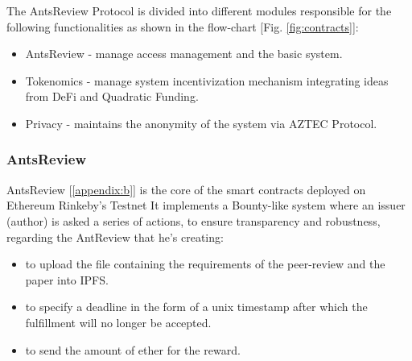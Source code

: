 \documentclass[runningheads]{llncs}
\begin{document}
The AntsReview Protocol is divided into different modules responsible for the following functionalities as shown in the flow-chart [Fig. \ref{fig:contracts}]:

\begin{itemize}
\item AntsReview - manage access management and the basic system.
\item Tokenomics - manage system incentivization mechanism integrating ideas from DeFi and Quadratic Funding.
\item Privacy - maintains the anonymity of the system via AZTEC Protocol.
\end{itemize}

\subsubsection{AntsReview}

AntsReview [\ref{appendix:b}] is the core of the smart contracts deployed on Ethereum Rinkeby's Testnet \cite{Rinkeby}
\newline It implements a Bounty-like system where an issuer (author) is asked a series of actions, to ensure transparency and robustness, regarding the AntReview that he's creating:
\begin{itemize}
  \item to upload the file containing the requirements of the peer-review and the paper into IPFS\cite{IPFS}.
  \item to specify a deadline in the form of a unix timestamp after which the fulfillment will no longer be accepted.
  \item to send the amount of ether for the reward.
\end{itemize}
\end{document}
